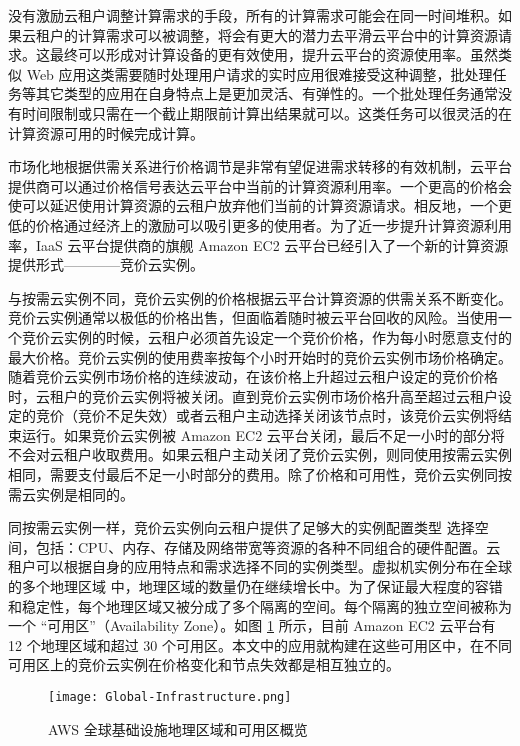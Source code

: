 没有激励云租户调整计算需求的手段，所有的计算需求可能会在同一时间堆积。如果云租户的计算需求可以被调整，将会有更大的潜力去平滑云平台中的计算资源请求。这最终可以形成对计算设备的更有效使用，提升云平台的资源使用率。虽然类似 Web 应用这类需要随时处理用户请求的实时应用很难接受这种调整，批处理任务等其它类型的应用在自身特点上是更加灵活、有弹性的。一个批处理任务通常没有时间限制或只需在一个截止期限前计算出结果就可以。这类任务可以很灵活的在计算资源可用的时候完成计算。

市场化地根据供需关系进行价格调节是非常有望促进需求转移的有效机制，云平台提供商可以通过价格信号表达云平台中当前的计算资源利用率。一个更高的价格会使可以延迟使用计算资源的云租户放弃他们当前的计算资源请求。相反地，一个更低的价格通过经济上的激励可以吸引更多的使用者。为了近一步提升计算资源利用率，IaaS 云平台提供商的旗舰 Amazon EC2 云平台已经引入了一个新的计算资源提供形式————竞价云实例。

与按需云实例不同，竞价云实例的价格根据云平台计算资源的供需关系不断变化。竞价云实例通常以极低的价格出售，但面临着随时被云平台回收的风险。当使用一个竞价云实例的时候，云租户必须首先设定一个竞价价格，作为每小时愿意支付的最大价格。竞价云实例的使用费率按每个小时开始时的竞价云实例市场价格确定。随着竞价云实例市场价格的连续波动，在该价格上升超过云租户设定的竞价价格时，云租户的竞价云实例将被关闭。直到竞价云实例市场价格升高至超过云租户设定的竞价（竞价不足失效）或者云租户主动选择关闭该节点时，该竞价云实例将结束运行。如果竞价云实例被 Amazon EC2 云平台关闭，最后不足一小时的部分将不会对云租户收取费用。如果云租户主动关闭了竞价云实例，则同使用按需云实例相同，需要支付最后不足一小时部分的费用。除了价格和可用性，竞价云实例同按需云实例是相同的。

同按需云实例一样，竞价云实例向云租户提供了足够大的实例配置类型 \cite{AWS_IT:2014} 选择空间，包括：CPU、内存、存储及网络带宽等资源的各种不同组合的硬件配置。云租户可以根据自身的应用特点和需求选择不同的实例类型。虚拟机实例分布在全球的多个地理区域 \cite{AWS_GI:2014} 中，地理区域的数量仍在继续增长中。为了保证最大程度的容错和稳定性，每个地理区域又被分成了多个隔离的空间。每个隔离的独立空间被称为一个 ``可用区''（Availability Zone）。如图 \ref{figure:aws-gi} 所示，目前 Amazon EC2 云平台有 12 个地理区域和超过 30 个可用区。本文中的应用就构建在这些可用区中，在不同可用区上的竞价云实例在价格变化和节点失效都是相互独立的。
\begin{figure}
  \centering
  \texttt{[image: Global-Infrastructure.png]}
  \caption{AWS 全球基础设施地理区域和可用区概览 \cite{AWS_GI:2014}}
  \label{figure:aws-gi}
\end{figure}

